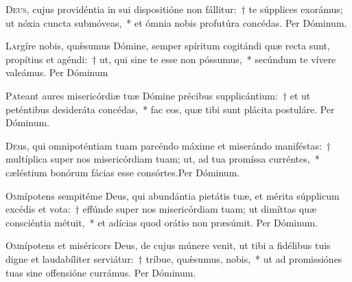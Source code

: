 \documentclass[vesperale_romanum.tex]{subfiles}
\begin{document}
\lettrine{D}{eus}, cujus providéntia in sui dispositióne non fállitur:~† te súpplices exorámus; ut nóxia cuncta submóveas,~* et ómnia nobis profutúra concédas.
Per Dóminum. 



\oratio

\lettrine{L}{a}rgíre nobis, quǽsumus Dómine, semper spíritum cogitándi quæ recta sunt, propítius et agéndi:~† ut, qui sine te esse non póssumus,~* secúndum te vívere valeámus. Per Dóminum 



\oratio

\lettrine{P}{a}teant aures misericórdiæ tuæ Dómine précibus supplicántium:~† et ut peténtibus desideráta concédas,~* fac eos, quæ tibi sunt plácita postuláre.
Per Dóminum.



\oratio

\lettrine{D}{e}us, qui omnipoténtiam tuam parcéndo máxime et miserándo maniféstas:~† multíplica super nos misericórdiam tuam; ut, ad tua promíssa curréntes,~* cæléstium bonórum fácias esse consórtes.Per Dóminum.



\oratio

\lettrine{O}{m}nípotens sempitéme Deus, qui abundántia pietátis tuæ, et mérita súpplicum excédis et vota:~† effúnde super nos misericórdiam tuam; ut dimíttas quæ consciéntia métuit,~* et adícias quod orátio non præsúmit. Per Dóminum.



\oratio

\lettrine{O}{m}nípotens et miséricors Deus, de cujus múnere venit, ut tibi a fidélibus tuis digne et laudabíliter serviátur:~† tríbue, quǽsumus, nobis,~* ut ad promissiónes tuas sine offensióne currámus. Per Dóminum.
\end{document}
